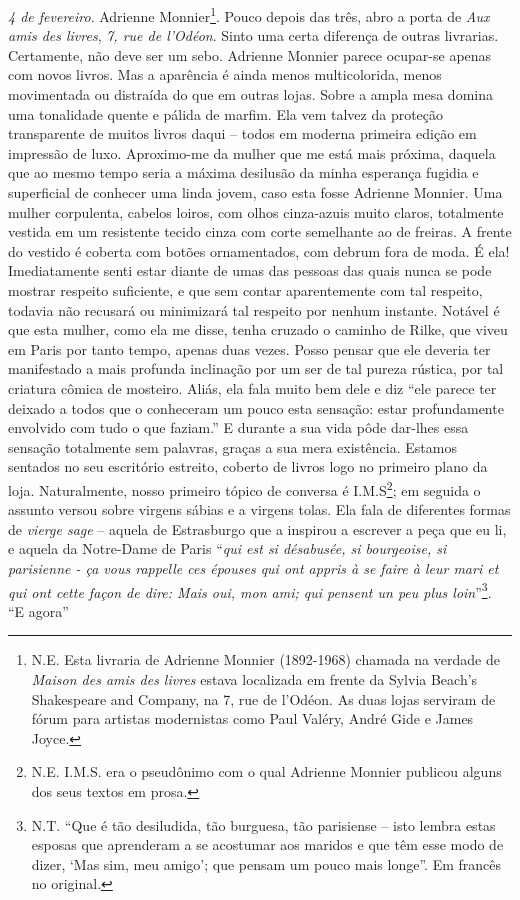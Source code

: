\emph{4 de fevereiro}. Adrienne Monnier\footnote{N.E. Esta livraria de
  Adrienne Monnier (1892-1968) chamada na verdade de \emph{Maison des
  amis des livres} estava localizada em frente da Sylvia Beach's
  Shakespeare and Company, na 7, rue de l'Odéon. As duas lojas serviram
  de fórum para artistas modernistas como Paul Valéry, André Gide e
  James Joyce.}. Pouco depois das três, abro a porta de \emph{Aux amis
des livres}, \emph{7, rue de l'Odéon}. Sinto uma certa diferença de
outras livrarias. Certamente, não deve ser um sebo. Adrienne Monnier
parece ocupar-se apenas com novos livros. Mas a aparência é ainda menos
multicolorida, menos movimentada ou distraída do que em outras lojas.
Sobre a ampla mesa domina uma tonalidade quente e pálida de marfim. Ela
vem talvez da proteção transparente de muitos livros daqui -- todos em
moderna primeira edição em impressão de luxo. Aproximo-me da mulher que
me está mais próxima, daquela que ao mesmo tempo seria a máxima
desilusão da minha esperança fugidia e superficial de conhecer uma linda
jovem, caso esta fosse Adrienne Monnier. Uma mulher corpulenta, cabelos
loiros, com olhos cinza-azuis muito claros, totalmente vestida em um
resistente tecido cinza com corte semelhante ao de freiras. A frente do
vestido é coberta com botões ornamentados, com debrum fora de moda. É
ela! Imediatamente senti estar diante de umas das pessoas das quais
nunca se pode mostrar respeito suficiente, e que sem contar
aparentemente com tal respeito, todavia não recusará ou minimizará tal
respeito por nenhum instante. Notável é que esta mulher, como ela me
disse, tenha cruzado o caminho de Rilke, que viveu em Paris por tanto
tempo, apenas duas vezes. Posso pensar que ele deveria ter manifestado a
mais profunda inclinação por um ser de tal pureza rústica, por tal
criatura cômica de mosteiro. Aliás, ela fala muito bem dele e diz ``ele
parece ter deixado a todos que o conheceram um pouco esta sensação:
estar profundamente envolvido com tudo o que faziam.'' E durante a sua
vida pôde dar-lhes essa sensação totalmente sem palavras, graças a sua
mera existência. Estamos sentados no seu escritório estreito, coberto de
livros logo no primeiro plano da loja. Naturalmente, nosso primeiro
tópico de conversa é I.M.S\footnote{N.E. I.M.S. era o pseudônimo com o
  qual Adrienne Monnier publicou alguns dos seus textos em prosa.}; em
seguida o assunto versou sobre virgens sábias e a virgens tolas. Ela
fala de diferentes formas de \emph{vierge sage} -- aquela de Estrasburgo
que a inspirou a escrever a peça que eu li, e aquela da Notre-Dame de
Paris ``\emph{qui est si désabusée, si bourgeoise, si parisienne - ça
vous rappelle ces épouses qui ont appris à se faire à leur mari et qui
ont cette façon de dire: Mais oui, mon ami; qui pensent un peu plus
loin}''\footnote{N.T. ``Que é tão desiludida, tão burguesa, tão
  parisiense -- isto lembra estas esposas que aprenderam a se acostumar
  aos maridos e que têm esse modo de dizer, `Mas sim, meu amigo'; que
  pensam um pouco mais longe''. Em francês no original.}. ``E agora''
